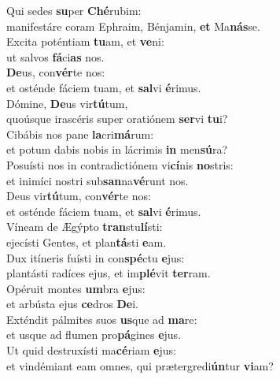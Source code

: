 \evenverse Qui sedes \textbf{su}per \textbf{Ché}rubim:~\*\\
\evenverse manifestáre coram Ephraim, Bénjamin, \textbf{et} Ma\textbf{nás}se.\\
\oddverse Excita poténtiam \textbf{tu}am, et \textbf{ve}ni:~\*\\
\oddverse ut salvos \textbf{fá}ci\textbf{as} nos.\\
\evenverse \textbf{De}us, con\textbf{vér}te nos:~\*\\
\evenverse et osténde fáciem tuam, et \textbf{sal}vi \textbf{é}rimus.\\
\oddverse Dómine, \textbf{De}us vir\textbf{tú}tum,~\*\\
\oddverse quoúsque irascéris super oratiónem \textbf{ser}vi \textbf{tu}i?\\
\evenverse Cibábis nos pane \textbf{la}cri\textbf{má}rum:~\*\\
\evenverse et potum dabis nobis in lácrimis \textbf{in} men\textbf{sú}ra?\\
\oddverse Posuísti nos in contradictiónem vi\textbf{cí}nis \textbf{no}stris:~\*\\
\oddverse et inimíci nostri sub\textbf{san}na\textbf{vé}runt nos.\\
\evenverse Deus vir\textbf{tú}tum, con\textbf{vér}te nos:~\*\\
\evenverse et osténde fáciem tuam, et \textbf{sal}vi \textbf{é}rimus.\\
\oddverse Víneam de Ægýpto \textbf{tran}stu\textbf{lí}sti:~\*\\
\oddverse ejecísti Gentes, et plan\textbf{tá}sti \textbf{e}am.\\
\evenverse Dux itíneris fuísti in con\textbf{spé}ctu \textbf{e}jus:~\*\\
\evenverse plantásti radíces ejus, et im\textbf{plé}vit \textbf{ter}ram.\\
\oddverse Opéruit montes \textbf{um}bra \textbf{e}jus:~\*\\
\oddverse et arbústa ejus \textbf{ce}dros \textbf{De}i.\\
\evenverse Exténdit pálmites suos \textbf{us}que ad \textbf{ma}re:~\*\\
\evenverse et usque ad flumen pro\textbf{pá}gines \textbf{e}jus.\\
\oddverse Ut quid destruxísti ma\textbf{cé}riam \textbf{e}jus:~\*\\
\oddverse et vindémiant eam omnes, qui prætergredi\textbf{ún}tur \textbf{vi}am?\\
